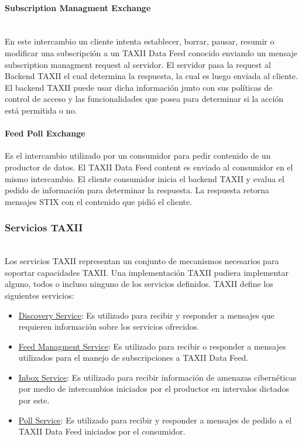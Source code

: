 \paragraph{Subscription Managment Exchange}\ \\

En este intercambio un cliente intenta establecer, borrar, pausar, resumir o modificar una 
subscripción a un TAXII Data Feed conocido enviando un mensaje subscription 
managment request al servidor. El servidor pasa la request al Backend TAXII el 
cual determina la respuesta, la cual es luego enviada al cliente.
El backend TAXII puede usar dicha información junto con sus 
políticas de control de acceso y las funcionalidades que posea para determinar 
si la acción está permitida o no.

\paragraph{Feed Poll Exchange}

Es el intercambio utilizado por un consumidor para pedir contenido de un productor de datos. El TAXII Data Feed content es enviado al consumidor en el mismo intercambio.
El cliente consumidor inicia el backend TAXII y evalua el pedido de información para determinar la respuesta. La respuesta retorna mensajes STIX con el contenido que pidió el cliente.

\subsubsection{Servicios TAXII}\ \\

Los servicios TAXII representan un conjunto de mecanismos necesarios para 
soportar capacidades TAXII. Una implementación TAXII pudiera implementar alguno, 
todos o incluso ninguno de los servicios definidos.
TAXII define los siguientes servicios:
\begin{itemize}
  \item \underline{Discovery Service}: Es utilizado para recibir y responder a 
  mensajes que requieren información sobre los servicios ofrecidos.
  \item \underline{Feed Managment Service}: Es utilizado para recibir o responder a mensajes 
  utilizados para el manejo de subscripciones a TAXII Data Feed.
  \item \underline{Inbox Service}: Es utilizado para recibir información de amenazas 
  cibernéticas por medio de intercambios iniciados por el productor en intervalos 
  dictados por este.
  \item \underline{Poll Service}: Es utilizado para recibir y responder a mensajes de pedido 
  a el TAXII Data Feed iniciados por el consumidor.
\end{itemize}


